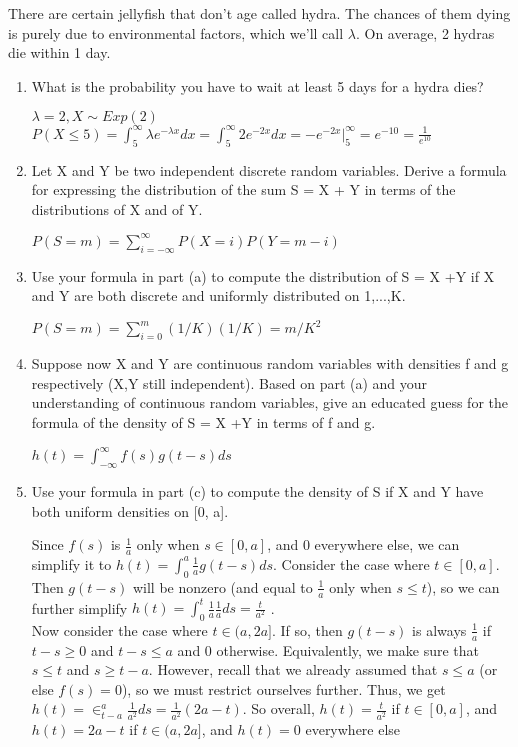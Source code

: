\question There are certain jellyfish that don’t age called hydra. The 
chances of them dying is purely due to environmental factors, which 
we’ll call $\lambda$. On average, 2 hydras die within 1 day.
\begin{enumerate}[label=(\alph*)]
\item What is the probability you have to wait at least 5 days for a 
hydra dies?
\begin{solution}[2.5cm]
$\lambda = 2, X \sim Exp(2)$ \\
$P(X\leq 5) = \int_5^\infty \lambda e^{-\lambda x} dx = \int_5^\infty 
2e^{-2x} dx = -e^{-2x} |_5^\infty = e^{-10} = \frac{1}{e^10}$
\end{solution}

\item
Let X and Y be two independent discrete random variables. Derive a 
formula for expressing the distribution of the sum S = X + Y in terms 
of the distributions of X and of Y.
\begin{solution}[2.5cm]
$P(S=m) = \sum_{i=-\infty}^\infty P(X = i)P(Y=m-i)$
\end{solution}
\item
Use your formula in part (a) to compute the distribution of S = X +Y 
if X and Y are both discrete and uniformly distributed on {1,...,K}.
\begin{solution}[2.5cm]
$P(S=m) = \sum_{i=0}^m (1/K)(1/K) = m/K^2$
\end{solution}
\item  Suppose now X and Y are continuous random variables with 
densities f and g respectively (X,Y still independent). Based on part 
(a) and your understanding of continuous random variables, give an 
educated guess for the formula of the density of S = X +Y in terms of f and g.
\begin{solution}[2cm]
$ h(t) = \int_{-\infty}^\infty f(s) g(t-s) ds $
\end{solution}

\item Use your formula in part (c) to compute the density of S if X 
and Y have both uniform densities on [0, a].
\begin{solution}
Since $f(s)$ is $\frac{1}{a}$ only when $s \in [0, a]$, and 0 everywhere 
else, we can simplify it to $h(t) = \int_0^a \frac{1}{a} g(t-s) ds$. 
Consider the case where $t \in [0,a]$. Then $g(t-s)$ will be nonzero 
(and equal to $\frac{1}{a}$ only when $s \leq t$), so we can further 
simplify $h(t) = \int_0^t \frac{1}{a} \frac{1}{a} ds = \frac{t}{a^2}$ . \\
Now consider the case where $t \in (a, 2a]$. If so, then $g(t-s)$ is 
always $\frac{1}{a}$ if $t-s\geq 0$ and $t-s\leq a$ and 0 otherwise. 
Equivalently, we make sure that $s\leq t$ and $s \geq t-a$. However, 
recall that we already assumed that $s \leq a$ (or else $f(s) = 0$), 
so we must restrict ourselves further. Thus, we get $h(t) = \in_{t-a}^a 
\frac{1}{a^2} ds = \frac{1}{a^2} (2a-t)$. So overall, $h(t) = 
\frac{t}{a^2}$ if $t \in [0, a]$, and $h(t) = 2a-t$ if $t \in (a, 2a]$, 
and $h(t) = 0$ everywhere else

\end{solution}

\end{enumerate}